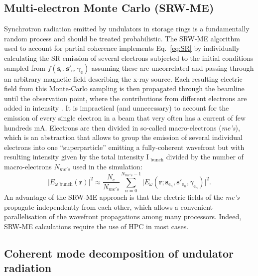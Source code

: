 \documentclass{iucr}              %
\begin{document}
\subsection{Multi-electron Monte Carlo (SRW-ME)}

Synchrotron radiation emitted by undulators in storage rings is a fundamentally random process and should be treated probabilistic. The SRW-ME algorithm used to account for partial coherence implements Eq.~\ref{eq:SR} by individually calculating the SR emission of several electrons subjected to the initial conditions sampled from $f(\textbf{s}_\text{e}, \textbf{s}'_\text{e}, \gamma_\text{e})$ assuming these are uncorrelated and passing through an arbitrary magnetic field describing the x-ray source. Each resulting electric field from this Monte-Carlo sampling is then propagated through the beamline until the observation point, where the contributions from different electrons are added in intensity \cite{codeSRW_ME}. It is impractical (and unnecessary) to account for the emission of every single electron in a beam that very often has a current of few hundreds mA. Electrons are then divided in so-called macro-electrons (\textit{me's}), which is an abstraction that allows to group the emission of several individual electrons into one ``superparticle'' emitting a fully-coherent wavefront but with resulting intensity given by the total intensity $\text{I}_\text{~bunch}$ divided by the number of macro-electrons $N_{me's}$ used in the simulation:
\begin{equation}
|E_{\omega\text{~bunch}}(\textbf{r})|^2 \approx \frac{N_e}{N_{me's}}\sum_{n=0}^{N_{me's} - 1}\big| E_\omega(\textbf{r};\textbf{s}_{\text{e}_n}, \textbf{s}'_{\text{e}_n}, \gamma_{\text{e}_n})\big|^2.
\label{eq:SR_SRW}
\end{equation}
An advantage of the SRW-ME approach is that the electric fields of the \textit{me's} propagate independently from each other, which allows a convenient parallelisation of the wavefront propagations among many processors. Indeed, SRW-ME calculations require the use of HPC in most cases.

\subsection{Coherent mode decomposition of undulator radiation}\label{sec:CMD}
\end{document}
